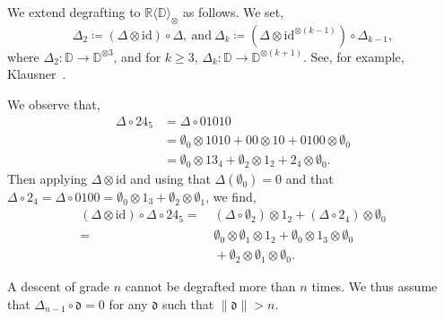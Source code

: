 \documentclass[5p,twocolumn]{elsarticle}
\newcommand*{\id}{{\mathrm{id}}}
\newcommand*{\R}{\mathbb R}
\newcommand*{\df}{\mathfrak d}
\begin{document}
We extend degrafting to $\R\langle\mathbb D\rangle_{\otimes}$ as follows. We set, 
\begin{equation*}
  \Delta_2\coloneqq(\Delta\otimes\id)\circ\Delta,~\text{and}~
  \Delta_k\coloneqq(\Delta\otimes\id^{\otimes(k-1)})\circ\Delta_{k-1},
\end{equation*}
where $\Delta_2\colon\mathbb D\to\mathbb D^{\otimes3}$, and for $k\geqslant3$, $\Delta_k\colon\mathbb D\to\mathbb D^{\otimes(k+1)}$.
See, for example, Klausner~\cite{Klausner}.
%
\begin{example}\label{ex:multipledegrafting}
  We observe that, 
  \begin{align*}
    \Delta\circ 24_5&=\Delta\circ 01010\\
                    &=\emptyset_0\otimes1010+00\otimes10+0100\otimes\emptyset_0\\
                    &=\emptyset_0\otimes13_4+\emptyset_2\otimes1_2+2_4\otimes\emptyset_0.
  \end{align*}
  Then applying $\Delta\otimes\id$ and using that $\Delta(\emptyset_0)=0$ and that
  $\Delta\circ2_4=\Delta\circ0100=\emptyset_0\otimes1_3+\emptyset_2\otimes\emptyset_1$, we find,
  \begin{align*}
    (\Delta\otimes\id)\circ\Delta\circ 24_5
    =&\;(\Delta\circ\emptyset_2)\otimes1_2+(\Delta\circ2_4)\otimes\emptyset_0\\
    =&\;\emptyset_0\otimes\emptyset_1\otimes1_2+\emptyset_0\otimes1_3\otimes\emptyset_0\\
    &\;+\emptyset_2\otimes\emptyset_1\otimes\emptyset_0. 
  \end{align*}  
\end{example}
%
\begin{remark}[Convention]\label{rmk:convention}
A descent of grade $n$ cannot be degrafted more than $n$ times. We thus assume that $\Delta_{n-1}\circ\df=0$ for any $\df$ such that $\|\df\|>n$.
\end{remark}
%
\end{document}
